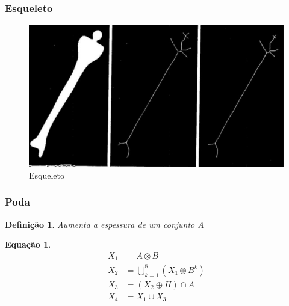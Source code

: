 \documentclass[aspectratio=169]{beamer}
\theoremstyle{Definition}
\newtheorem{defn}{Defini\c c\~ao}
\newtheorem{eq}[theorem]{Equa\c c\~ao}
\begin{document}
\begin{frame}
	\frametitle{Esqueleto}
	
	\begin{figure}[h]
	 	\includegraphics[width=0.6\paperwidth,height=0.6\paperheight]{imagens/skeleton1}
		\caption{Esqueleto}\label{figSkeleton}
	\end{figure}
	
\end{frame}

\begin{frame}
	\frametitle{Poda}
	
	\begin{defn}
		Aumenta a espessura de um conjunto A
	\end{defn}
	
	\begin{eq}
			\begin{align}
				X_1 &= A \otimes B \\
				X_2 &= \bigcup^8_{k=1} (X_1 \circledast B^k) \\
				X_3 &= (X_2 \oplus H) \cap A \\
				X_4 &= X_1 \cup X_3
		\end{align}
	\end{eq}
	
\end{frame}
\end{document}
